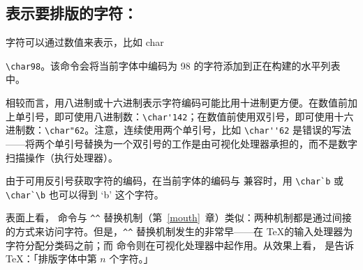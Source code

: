 \documentclass{book}
\begin{document}
\subsection{表示要排版的字符：\protect{}}

字符可以通过数值来表示，比如 \cstoidx char\par\verb-\char98-。该命令会将当前字体中编码为 98 的字符添加到正在构建的水平列表中。

相较而言，用八进制或十六进制表示字符编码可能比用十进制更方便。在数值前加上单引号，即可使用八进制数：\verb.\char'142.；在数值前使用双引号，即可使用十六进制数：\verb.\char"62.。注意，连续使用两个单引号，比如 \verb.\char''62. 是错误的写法——将两个单引号替换为一个双引号的工作是由可视化处理器承担的，而不是数字扫描操作（执行处理器）。

由于可用反引号获取字符的编码，在当前字体的编码与 \ascii 兼容时，用 \verb.\char`b. 或 \verb.\char`\b. 也可以得到 `b' 这个字符。

表面上看， 命令与 \verb.^^. 替换机制（第~\ref{mouth}~章）类似：两种机制都是通过间接的方式来访问字符。但是，\verb.^^. 替换机制发生的非常早——在 \TeX 的输入处理器为字符分配分类码之前；而  命令则在可视化处理器中起作用。从效果上看， 是告诉 \TeX：「排版字体中第 $n$ 个字符。」
\end{document}
